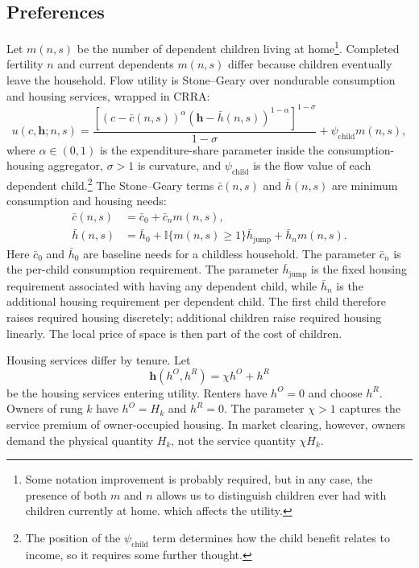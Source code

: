 \documentclass[11pt]{article}
\newcommand{\ind}{\mathbb{I}}
\begin{document}
\subsection{Preferences}
Let $m(n,s)$ be the number of dependent children living at home\footnote{Some notation improvement is probably required, but in any case, the presence of both $m$ and $n$ allows us to distinguish children ever had with children currently at home. which affects the utility.}. Completed fertility $n$ and current dependents $m(n,s)$ differ because children eventually leave the household. Flow utility is Stone--Geary over nondurable consumption and housing services, wrapped in CRRA:
\begin{equation}
u(c,\mathbf h;n,s)
=
\frac{
\left[
\left(c-\bar c(n,s)\right)^\alpha
\left(\mathbf h-\bar h(n,s)\right)^{1-\alpha}
\right]^{1-\sigma}
}{1-\sigma}
+\psi_{\mathrm{child}}m(n,s),
\label{eq:flow_utility}
\end{equation}
where $\alpha\in(0,1)$ is the expenditure-share parameter inside the consumption-housing aggregator, $\sigma>1$ is curvature, and $\psi_{\mathrm{child}}$ is the flow value of each dependent child.\footnote{The position of the $\psi_{\mathrm{child}}$ term determines how the child benefit relates to income, so it requires some further thought.} The Stone--Geary terms $\bar c(n,s)$ and $\bar h(n,s)$ are minimum consumption and housing needs:
\begin{equation*}
\begin{aligned}
\bar c(n,s)
    &=\bar c_0+\bar c_n m(n,s),\\
\bar h(n,s)
    &=\bar h_0
      +\ind\{m(n,s)\geq 1\}\bar h_{\mathrm{jump}}
      +\bar h_n m(n,s).
\end{aligned}
\end{equation*}
Here $\bar c_0$ and $\bar h_0$ are baseline needs for a childless household. The parameter $\bar c_n$ is the per-child consumption requirement. The parameter $\bar h_{\mathrm{jump}}$ is the fixed housing requirement associated with having any dependent child, while $\bar h_n$ is the additional housing requirement per dependent child. The first child therefore raises required housing discretely; additional children raise required housing linearly. The local price of space is then part of the cost of children.

Housing services differ by tenure. Let
\begin{equation*}
    \mathbf h(h^O,h^R)=\chi h^O+h^R
\end{equation*}
be the housing services entering utility. Renters have $h^O=0$ and choose $h^R$. Owners of rung $k$ have $h^O=H_k$ and $h^R=0$. The parameter $\chi>1$ captures the service premium of owner-occupied housing. In market clearing, however, owners demand the physical quantity $H_k$, not the service quantity $\chi H_k$.
\end{document}
